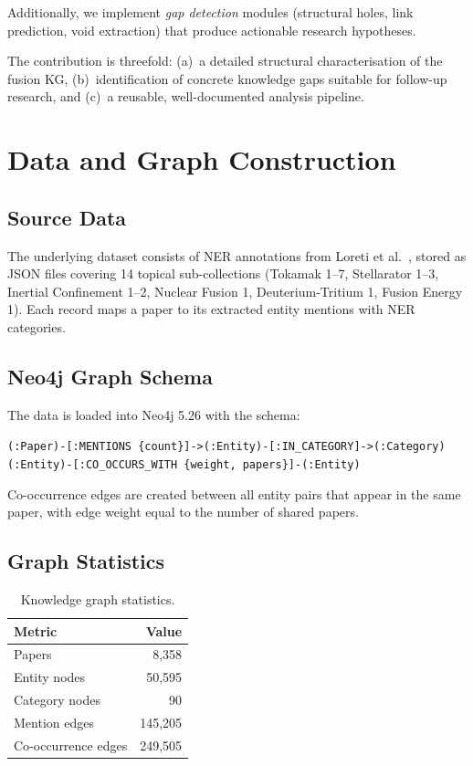 \documentclass[11pt,a4paper]{article}
\begin{document}
Additionally, we implement \emph{gap detection} modules (structural holes, link prediction, void extraction) that produce actionable research hypotheses.

The contribution is threefold: (a)~a detailed structural characterisation of the fusion KG, (b)~identification of concrete knowledge gaps suitable for follow-up research, and (c)~a reusable, well-documented analysis pipeline.

\section{Data and Graph Construction}

\subsection{Source Data}

The underlying dataset consists of NER annotations from Loreti et al.\ \citep{loreti2025}, stored as JSON files covering 14 topical sub-collections (Tokamak 1--7, Stellarator 1--3, Inertial Confinement 1--2, Nuclear Fusion 1, Deuterium-Tritium 1, Fusion Energy 1).  Each record maps a paper to its extracted entity mentions with NER categories.

\subsection{Neo4j Graph Schema}

The data is loaded into Neo4j 5.26 with the schema:

\begin{center}
\texttt{(:Paper)-[:MENTIONS \{count\}]->(:Entity)-[:IN\_CATEGORY]->(:Category)}\\
\texttt{(:Entity)-[:CO\_OCCURS\_WITH \{weight, papers\}]-(:Entity)}
\end{center}

Co-occurrence edges are created between all entity pairs that appear in the same paper, with edge weight equal to the number of shared papers.

\subsection{Graph Statistics}

\begin{table}[h]
\centering
\begin{tabular}{lr}
\toprule
Metric & Value \\
\midrule
Papers & 8,358 \\
Entity nodes & 50,595 \\
Category nodes & 90 \\
Mention edges & 145,205 \\
Co-occurrence edges & 249,505 \\
\bottomrule
\end{tabular}
\caption{Knowledge graph statistics.}
\label{tab:stats}
\end{table}
\end{document}
